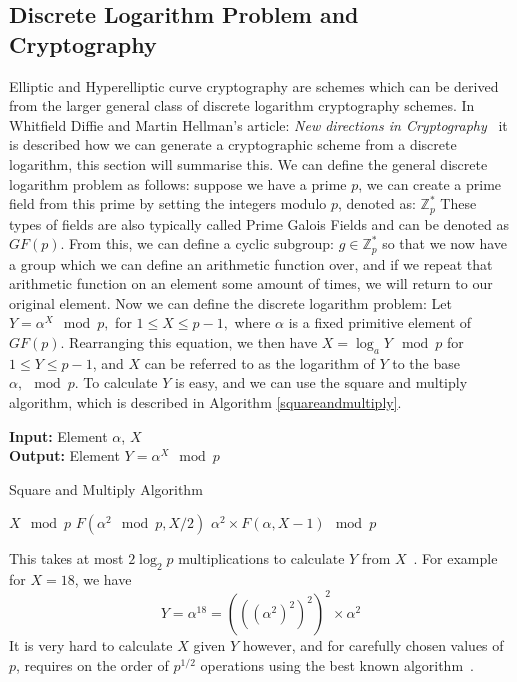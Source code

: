 \subsection{Discrete Logarithm Problem and Cryptography}
Elliptic and Hyperelliptic curve cryptography are schemes which can be derived from the larger general class of discrete logarithm cryptography schemes. In Whitfield Diffie and Martin Hellman's article: \emph{New directions in Cryptography}~\cite{Diffie:2006:NDC:2263321.2269104} it is described how we can generate a cryptographic scheme from a discrete logarithm, this section will summarise this. We can define the general discrete logarithm problem as follows: suppose we have a prime $p$, we can create a prime field from this prime by setting the integers modulo $p$, denoted as: $\mathbb{Z}_p^{*}$ These types of fields are also typically called Prime Galois Fields and can be denoted as $GF(p)$. From this, we can define a cyclic subgroup: $g \in \mathbb{Z}_p^{*}$ so that we now have a group which we can define an arithmetic function over, and if we repeat that arithmetic function on an element some amount of times, we will return to our original element. Now we can define the discrete logarithm problem: Let $Y = \alpha^X\mod{p},$ for $1 \leq X \leq p-1,$ where $\alpha$ is a fixed primitive element of $GF(p)$. Rearranging this equation, we then have $X = \log_aY\mod{p}$ for $1 \leq Y \leq p-1$, and $X$ can be referred to as the logarithm of $Y$ to the base $\alpha,\mod{p}.$ To calculate $Y$ is easy, and we can use the square and multiply algorithm, which is described in Algorithm \ref{squareandmultiply}.
\begin{algorithm}[!b]
\textbf{Input:} Element $\alpha$, $X$ \\
\textbf{Output:} Element $Y = \alpha^X\mod p$ 
\caption{Square and Multiply Algorithm}\label{squareandmultiply}
\algrule
\begin{algorithmic}[1]
\Return $X \mod{p}$
\Return $F(\alpha^2\mod{p}, X/2)$ 
\Return $\alpha^2 \times F(\alpha, X-1) \mod{p}$
\EndIf
\EndFunction
\end{algorithmic}
\end{algorithm}
This takes at most $2\log_2p$ multiplications to calculate $Y$ from $X$~\cite{10007220734}. For example for $X = 18$, we have $$Y = \alpha^{18} = (((\alpha^2)^2)^2)^2 \times \alpha^2$$ It is very hard to calculate $X$ given $Y$ however, and for carefully chosen values of $p$, requires on the order of $p^{1/2}$ operations using the best known algorithm~\cite{mcclellan1974art}. 
